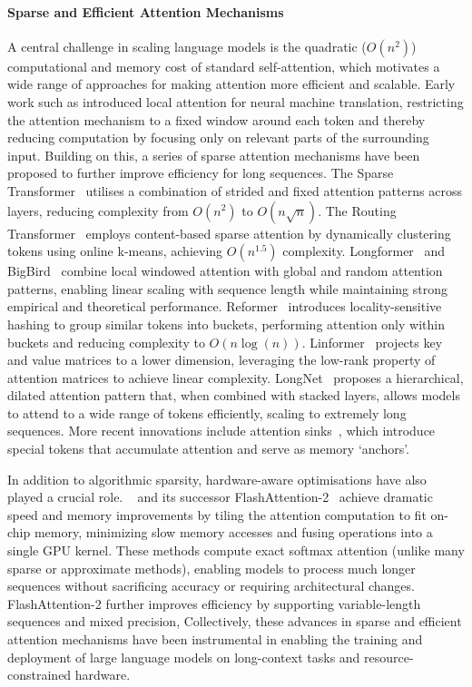 \paragraph{Sparse and Efficient Attention Mechanisms}
A central challenge in scaling language models is the quadratic ($O(n^2)$) computational and memory cost of standard self-attention, which motivates a wide range of approaches for making attention more efficient and scalable. Early work such as \citet{luong2015effective} introduced local attention for neural machine translation, restricting the attention mechanism to a fixed window around each token and thereby reducing computation by focusing only on relevant parts of the surrounding input. Building on this, a series of sparse attention mechanisms have been proposed to further improve efficiency for long sequences. The Sparse Transformer~\citep{child2019generating} utilises a combination of strided and fixed attention patterns across layers, reducing complexity from $O(n^2)$ to $O(n\sqrt{n})$. The Routing Transformer~\citep{roy2020efficient} employs content-based sparse attention by dynamically clustering tokens using online k-means, achieving $O(n^{1.5})$ complexity. Longformer~\citep{beltagy2020longformer} and BigBird~\citep{zaheer2020big} combine local windowed attention with global and random attention patterns, enabling linear scaling with sequence length while maintaining strong empirical and theoretical performance. Reformer~\citep{kitaev2020reformer} introduces locality-sensitive hashing to group similar tokens into buckets, performing attention only within buckets and reducing complexity to $O(n\log(n))$. Linformer~\citep{wang2020linformer} projects key and value matrices to a lower dimension, leveraging the low-rank property of attention matrices to achieve linear complexity. LongNet~\citep{ding2023longnet} proposes a hierarchical, dilated attention pattern that, when combined with stacked layers, allows models to attend to a wide range of tokens efficiently, scaling to extremely long sequences. More recent innovations include attention sinks~\citep{xiao2023attentionsink}, which introduce special tokens that accumulate attention and serve as memory `anchors'. 


In addition to algorithmic sparsity, hardware-aware optimisations have also played a crucial role. ~\citep{dao2022flashattention} and its successor FlashAttention-2~\citep{dao2023flashattention2} achieve dramatic speed and memory improvements by tiling the attention computation to fit on-chip memory, minimizing slow memory accesses and fusing operations into a single GPU kernel. These methods compute exact softmax attention (unlike many sparse or approximate methods), enabling models to process much longer sequences without sacrificing accuracy or requiring architectural changes. FlashAttention-2 further improves efficiency by supporting variable-length sequences and mixed precision,  Collectively, these advances in sparse and efficient attention mechanisms have been instrumental in enabling the training and deployment of large language models on long-context tasks and resource-constrained hardware.

